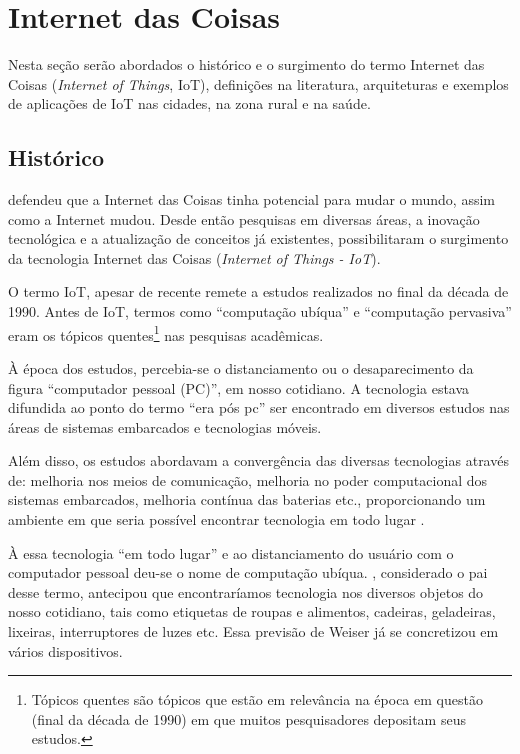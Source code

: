 \section{Internet das Coisas} \label{sec:iot}

Nesta seção serão abordados o histórico e o surgimento do termo
Internet das Coisas (\textit{Internet of Things}, IoT), definições
na literatura, arquiteturas e exemplos de aplicações de IoT nas cidades,
na zona rural e na saúde.

\subsection{Histórico} \label{subsec:iot-historico}

 defendeu que a Internet
das Coisas tinha potencial para mudar o mundo, assim como a Internet mudou.
Desde então pesquisas em diversas áreas, a inovação tecnológica e a atualização
de conceitos já existentes, possibilitaram o surgimento da tecnologia Internet das
Coisas (\textit{Internet of Things - IoT}).

O termo IoT, apesar de recente remete a estudos realizados no final da década
de 1990. Antes de IoT, termos como ``computação ubíqua'' e ``computação pervasiva''
eram os tópicos quentes\footnote{Tópicos quentes são tópicos que estão em relevância
na época em questão (final da década de 1990) em que muitos pesquisadores depositam seus 
estudos.} nas pesquisas acadêmicas.

À época dos estudos, percebia-se o distanciamento ou o desaparecimento da
figura ``computador pessoal (PC)'', em nosso cotidiano. A tecnologia estava
difundida ao ponto do termo  ``era pós pc'' ser encontrado em diversos estudos
\cite{bonilla2011inclusao,  chen2011pospc, press1999personal} nas áreas de
sistemas embarcados e tecnologias móveis.

Além disso, os estudos abordavam a convergência das diversas tecnologias 
através de: melhoria nos meios de comunicação, melhoria no poder computacional
dos sistemas embarcados, melhoria contínua das baterias etc., proporcionando
um ambiente em que seria possível encontrar tecnologia em todo lugar
\cite{lyytinen2002ubiquitous}.

À essa tecnologia ``em todo lugar'' e ao distanciamento do usuário com o
computador pessoal deu-se o nome de computação ubíqua.
, considerado o pai desse termo, antecipou que
encontraríamos tecnologia nos diversos objetos do nosso cotidiano, tais como
etiquetas de roupas e alimentos, cadeiras, geladeiras, lixeiras, interruptores
de luzes etc. Essa previsão de Weiser já se concretizou em vários dispositivos.

